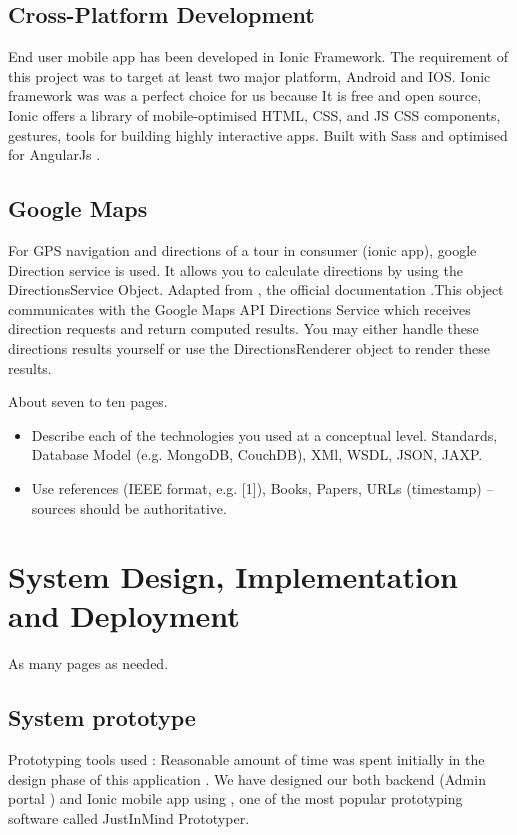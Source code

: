 		\section{Cross-Platform Development}
		End user mobile app has been developed in Ionic Framework.  The requirement of this project was to target at least two major platform, Android and IOS. Ionic framework was was a perfect choice for us because It is free and open source, Ionic offers a library of mobile-optimised HTML, CSS, and JS CSS components, gestures, tools for building highly interactive apps. Built with Sass and optimised for AngularJs \cite{expressRef}.
		
		\section{Google Maps}
		For GPS navigation and directions of a tour in consumer (ionic app), google Direction service is used. It allows you to calculate directions by using the DirectionsService Object. Adapted from \cite{GoogleMapDirection}, the official documentation .This object communicates with the Google Maps API Directions Service which receives direction requests and return computed results. You may either handle these directions results yourself or use the DirectionsRenderer object to render these results. 
		
	
About seven to ten pages.
\begin{itemize}
	\item Describe each of the technologies you used at a conceptual level. Standards, Database Model (e.g. MongoDB, CouchDB), XMl, WSDL, JSON, JAXP.
	\item Use references (IEEE format, e.g. [1]), Books, Papers, URLs (timestamp) – sources should be authoritative. 
\end{itemize}



\chapter{System Design, Implementation and Deployment}
As many pages as needed.
	\section {System prototype}
	Prototyping tools used : Reasonable amount of time was spent initially in the design phase of this application . We have designed our both backend (Admin portal ) and Ionic mobile app using , one of the most popular prototyping software called JustInMind Prototyper. 
	
